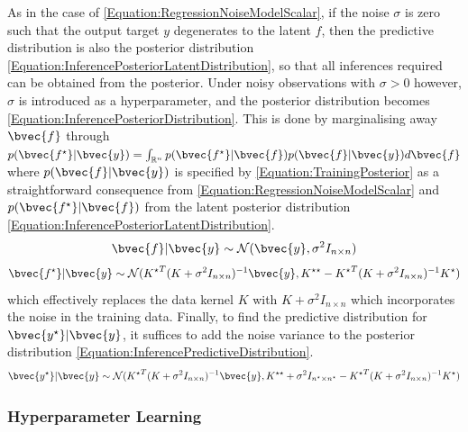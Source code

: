 				As in the case of \eqref{Equation:RegressionNoiseModelScalar}, if the noise $\sigma$ is zero such that the output target $y$ degenerates to the latent $f$, then the predictive distribution is also the posterior distribution \eqref{Equation:InferencePosteriorLatentDistribution}, so that all inferences required can be obtained from the posterior. Under noisy observations with $\sigma > 0$ however, $\sigma$ is introduced as a hyperparameter, and the posterior distribution becomes \eqref{Equation:InferencePosteriorDistribution}. This is done by marginalising away $\bvec{f}$ through $p(\bvec{f^{\star}} | \bvec{y}) = \int_{\mathbb{R}^{n}} p(\bvec{f^{\star}} | \bvec{f}) p(\bvec{f} | \bvec{y}) d\bvec{f}$ where $p(\bvec{f} | \bvec{y})$ is specified by \eqref{Equation:TrainingPosterior} as a straightforward consequence from \eqref{Equation:RegressionNoiseModelScalar} and $p(\bvec{f^{\star}} | \bvec{f})$ from the latent posterior distribution \eqref{Equation:InferencePosteriorLatentDistribution}. \begin{equation}
					\bvec{f} | \bvec{y} \sim \mathcal{N}(\bvec{y}, \sigma^{2} I_{n \times n})
				\label{Equation:TrainingPosterior}
				\end{equation} \begin{equation}
					\bvec{f^{\star}} | \bvec{y} \sim \mathcal{N}({K^{\star}}^{T} (K + \sigma^{2} I_{n \times n})^{-1} \bvec{y}, K^{\star \star} - {K^{\star}}^{T} (K + \sigma^{2} I_{n \times n})^{-1} K^{\star})
				\label{Equation:InferencePosteriorDistribution}
				\end{equation} which effectively replaces the data kernel $K$ with $K + \sigma^{2} I_{n \times n}$ which incorporates the noise in the training data. Finally, to find the predictive distribution for $\bvec{y^{\star}} | \bvec{y}$, it suffices to add the noise variance to the posterior distribution \eqref{Equation:InferencePredictiveDistribution}. \begin{equation}
					\bvec{y^{\star}} | \bvec{y} \sim \mathcal{N}({K^{\star}}^{T} (K + \sigma^{2} I_{n \times n})^{-1} \bvec{y}, K^{\star \star} + \sigma^{2} I_{n^{\star} \times n^{\star}} - {K^{\star}}^{T} (K + \sigma^{2} I_{n \times n})^{-1} K^{\star})
				\label{Equation:InferencePredictiveDistribution}
				\end{equation}
								
			\subsubsection{Hyperparameter Learning}
			\label{Background:GaussianProcess:Regression:HyperparameterLearning}
			
